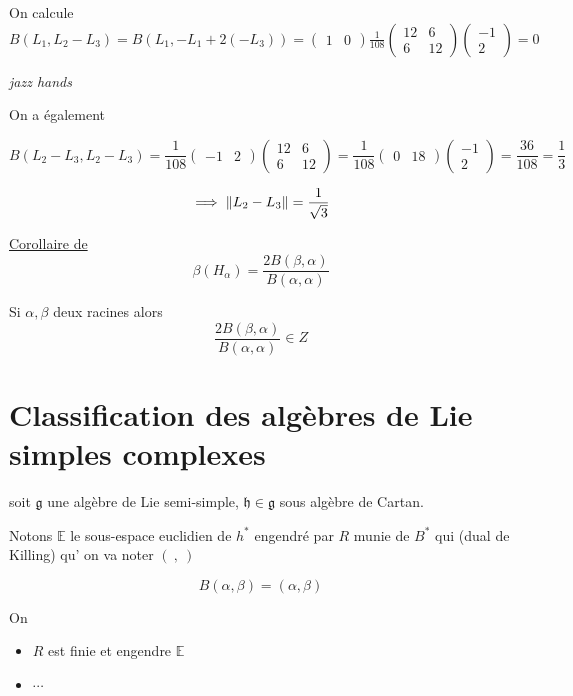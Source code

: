 On calcule \(B(L_1 , L_2 - L_3 )  = B(L_1, -L_1 +2 (-L_3) ) = \begin{pmatrix} 1 & 0 \end{pmatrix}  \frac{1}{108} \begin{pmatrix} 12 & 6 \\ 6 & 12 \end{pmatrix} \begin{pmatrix} -1 \\ 2 \end{pmatrix} = 0 \)

\textit{jazz hands}


On a également 

\[ B(L_2 - L_3 , L_2 - L_3 )  = \frac{1}{108} \begin{pmatrix} -1 & 2 \end{pmatrix} \begin{pmatrix} 12 & 6 \\ 6 & 12 \end{pmatrix} = \frac{1}{108} \begin{pmatrix} 0 & 18 \end{pmatrix} \begin{pmatrix} -1 \\ 2 \end{pmatrix} = \frac{36}{108} = \frac{1}{3}  \]

\[ \implies \norm{L_2 - L_3 } = \frac{1}{\sqrt{3 }}   \]

\underline{Corollaire de} \[ \beta (H_{\alpha} ) = \frac{2 B(\beta , \alpha ) }{B(\alpha ,\alpha ) }  \] 

Si \(\alpha ,\beta \) deux racines alors 
\[ \frac{2 B(\beta , \alpha ) }{B(\alpha ,\alpha )} \in Z  \]


\section*{Classification des algèbres de Lie simples complexes}

soit \(\mathfrak{g}\) une algèbre de Lie semi-simple, \(\mathfrak{h} \in \mathfrak{g}\) sous algèbre de Cartan.

Notons \(\mathbb{E}\) le sous-espace euclidien de \(h^{*}\) engendré par \(R\) munie de \(B^{*}\) qui (dual de Killing) qu' on va noter \((\ ,\ )\)

\[ B(\alpha, \beta)  = (\alpha ,\beta)  \]

On 
\begin{itemize}
	\item \(R\) est finie et engendre \(\mathds{E}\)
	\item \(\dotsb\)
\end{itemize}


